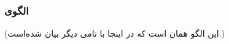 \subsubsection{الگوی }
\label{resourceCriticalSectionSec}
\begin{RTL}
(این الگو همان  است
که در اینجا با نامی دیگر بیان شده‌است.)
\end{RTL}